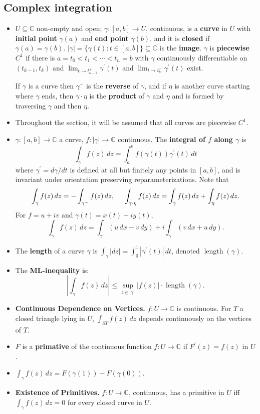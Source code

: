 \documentclass{article}
\DeclareMathOperator{\len}{length}
\newenvironment{topic}[1]{%
{\subsection{#1}}%
\begin{itemize}%
}{%
\end{itemize}%
}
\newcommand{\theorem}[1]{\item {\bf #1.}}
\newcommand{\term}[1]{{\bf #1}}
\newcommand{\remark}{\item}
\begin{document}
\begin{topic}{Complex integration}

\remark $U \subseteq \mathbb{C}$ non-empty and open; $\gamma : [a, b] \to U$, continuous, is a \term{curve} in $U$ with \term{initial point} $\gamma(a)$ and \term{end point} $\gamma(b)$, and it is \term{closed} if $\gamma(a) = \gamma(b)$. $|\gamma| = \{ \gamma(t) : t \in [a, b] \} \subseteq \mathbb{C}$ is the \term{image}. $\gamma$ is \term{piecewise $C^1$} if there is $a = t_0 < t_1 < \cdots < t_n = b$ with $\gamma$ continuously differentiable on $(t_{k-1}, t_k)$ and $\lim_{t \to t_{k-1}^+} \gamma^\prime(t)$ and $\lim_{t \to t_k^-} \gamma^\prime(t)$ exist.

If $\gamma$ is a curve then $\gamma^-$ is the \term{reverse} of $\gamma$, and if $\eta$ is another curve starting where $\gamma$ ends, then $\gamma \cdot \eta$ is the \term{product} of $\gamma$ and $\eta$ and is formed by traversing $\gamma$ and then $\eta$.

\remark Throughout the section, it will be assumed that all curves are piecewise $C^1$.

\remark $\gamma : [a, b] \to \mathbb{C}$ a curve, $f : |\gamma| \to \mathbb{C}$ continuous. The \term{integral of $f$ along $\gamma$} is $$\int_\gamma f(z)\,dz = \int_a^b f(\gamma(t)) \gamma^\prime(t)\,dt$$ where $\gamma^\prime = d\gamma/dt$ is defined at all but finitely any points in $[a, b]$, and is invariant under orientation preserving reparameterizations. Note that $$\int_\gamma f(z)\,dz = - \int_{\gamma^-} f(z)\,dz, \hskip 0.5cm \int_{\gamma \cdot \eta} f(z)\,dz = \int_\gamma f(z)\,dz + \int_\eta f(z)\,dz.$$ For $f = u + iv$ and $\gamma(t) = x(t) + iy(t)$, $$\int_\gamma f(z)\,dz = \int_\gamma (u\,dx - v\,dy) + i \int_\gamma (v\,dx + u\,dy).$$

\remark The \term{length} of a curve $\gamma$ is $\int_\gamma |dz| = \int_0^1 |\gamma^\prime(t)|\,dt$, denoted $\len(\gamma)$.

\remark The \term{ML-inequality} is: $$\left|\int_\gamma f(z)\,dz\right| \leq \sup_{z \in |\gamma|} |f(z)| \cdot \len(\gamma).$$

\theorem{Continuous Dependence on Vertices} $f : U \to \mathbb{C}$ is continuous. For $T$ a closed triangle lying in $U$, $\int_{\partial T} f(z)\,dz$ depends continuously on the vertices of $T$.

\remark $F$ is a \term{primative} of the continuous function $f : U \to \mathbb{C}$ if $F^\prime(z) = f(z)$ in $U$.

\remark $\int_{\gamma} f(z)\,dz = F(\gamma(1)) - F(\gamma(0))$.

\theorem{Existence of Primitives} $f : U \to \mathbb{C}$, continuous, has a primitive in $U$ iff $\int_\gamma f(z)\, dz = 0$ for every closed curve in $U$.

\end{topic}
\end{document}
